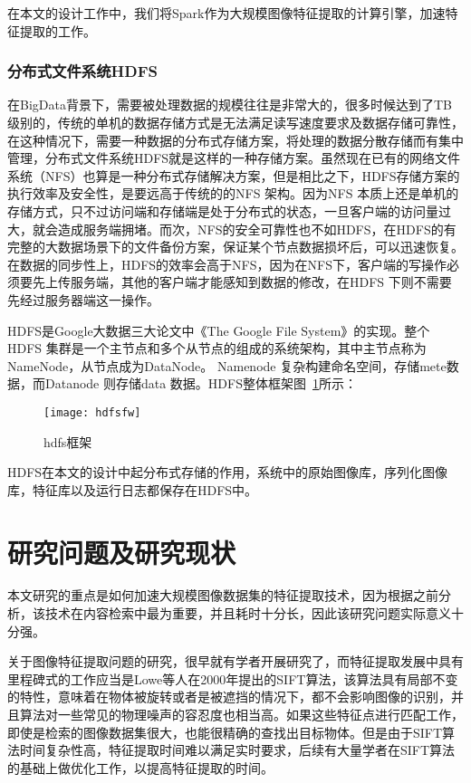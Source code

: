 在本文的设计工作中，我们将Spark作为大规模图像特征提取的计算引擎，加速特征提取的工作。
\subsubsection{分布式文件系统HDFS}
在BigData背景下，需要被处理数据的规模往往是非常大的，很多时候达到了TB级别的，传统的单机的数据存储方式是无法满足读写速度要求及数据存储可靠性，在这种情况下，需要一种数据的分布式存储方案，将处理的数据分散存储而有集中管理，分布式文件系统HDFS就是这样的一种存储方案。虽然现在已有的网络文件系统（NFS）也算是一种分布式存储解决方案，但是相比之下，HDFS存储方案的执行效率及安全性，是要远高于传统的的NFS 架构。因为NFS 本质上还是单机的存储方式，只不过访问端和存储端是处于分布式的状态，一旦客户端的访问量过大，就会造成服务端拥堵。而次，NFS的安全可靠性也不如HDFS，在HDFS的有完整的大数据场景下的文件备份方案，保证某个节点数据损坏后，可以迅速恢复。在数据的同步性上，HDFS的效率会高于NFS，因为在NFS下，客户端的写操作必须要先上传服务端，其他的客户端才能感知到数据的修改，在HDFS 下则不需要先经过服务器端这一操作。

HDFS是Google大数据三大论文中《The Google File System》的实现。整个HDFS 集群是一个主节点和多个从节点的组成的系统架构，其中主节点称为NameNode，从节点成为DataNode。 Namenode 复杂构建命名空间，存储mete数据，而Datanode 则存储data 数据。HDFS整体框架图~\ref{fig:hdfsfw}所示：
\begin{figure}[htp]
\centering
\texttt{[image: hdfsfw]}
\caption{hdfs框架}
\label{fig:hdfsfw}
\end{figure}

HDFS在本文的设计中起分布式存储的作用，系统中的原始图像库，序列化图像库，特征库以及运行日志都保存在HDFS中。

\section{研究问题及研究现状}
本文研究的重点是如何加速大规模图像数据集的特征提取技术，因为根据之前分析，该技术在内容检索中最为重要，并且耗时十分长，因此该研究问题实际意义十分强。

关于图像特征提取问题的研究，很早就有学者开展研究了，而特征提取发展中具有里程碑式的工作应当是Lowe等人在2000年提出的SIFT算法，该算法具有局部不变的特性，意味着在物体被旋转或者是被遮挡的情况下，都不会影响图像的识别，并且算法对一些常见的物理噪声的容忍度也相当高。如果这些特征点进行匹配工作，即使是检索的图像数据集很大，也能很精确的查找出目标物体。但是由于SIFT算法时间复杂性高，特征提取时间难以满足实时要求，后续有大量学者在SIFT算法的基础上做优化工作，以提高特征提取的时间。

